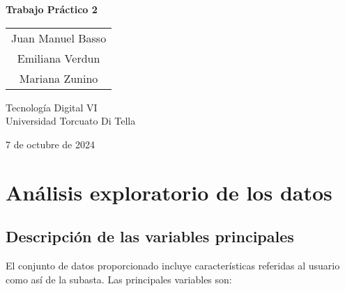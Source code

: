 \documentclass[a4paper,12pt]{article}
\begin{document}
\begin{titlepage}
    \centering
    \vspace*{5cm}  
    
    {\Huge\textbf{Trabajo Práctico 2}}\\[1.5cm]
    
    
    \begin{tabular}{c}  %
        {\Large Juan Manuel Basso}\\
        {\Large Emiliana Verdun}\\
        {\Large Mariana Zunino}
    \end{tabular}

    \vspace{1cm}
    
    {\Large Tecnología Digital VI}\\[0.5cm]
    {\Large Universidad Torcuato Di Tella}\\[0.5cm]
    
    \vfill
    
    {\Large 7 de octubre de 2024}  %
\end{titlepage}

\section{Análisis exploratorio de los datos}

\subsection{Descripción de las variables principales}

El conjunto de datos proporcionado incluye características referidas al usuario como así de la subasta. Las principales variables son:
\end{document}
